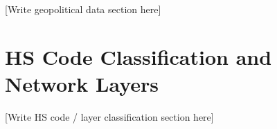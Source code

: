 [Write geopolitical data section here]

\section{HS Code Classification and Network Layers}
\label{sec:data_hs}


[Write HS code / layer classification section here]

